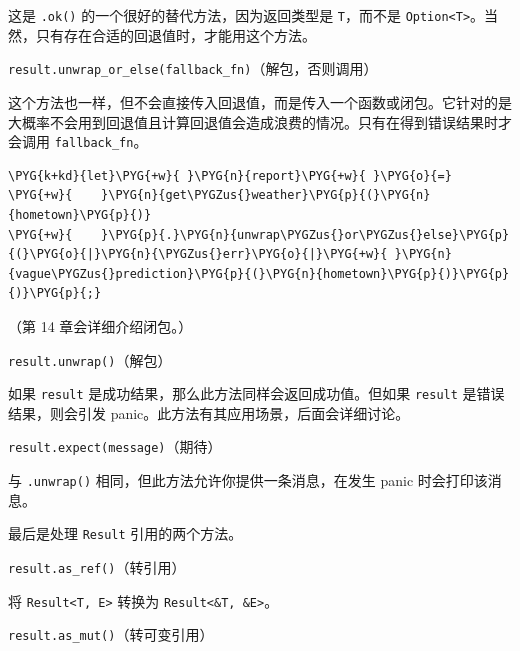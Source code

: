 这是 \texttt{.ok()} 的一个很好的替代方法，因为返回类型是 \texttt{T}，而不是 \texttt{Option<T>}。当然，只有存在合适的回退值时，才能用这个方法。

\begin{myNote}
\texttt{result.unwrap\_or\_else(fallback\_fn)}（解包，否则调用）
\end{myNote}

这个方法也一样，但不会直接传入回退值，而是传入一个函数或闭包。它针对的是大概率不会用到回退值且计算回退值会造成浪费的情况。只有在得到错误结果时才会调用 \texttt{fallback\_fn}。

\begin{Verbatim}[commandchars=\\\{\},breaklines=true,breakanywhere=true,fontsize=\codefont,xleftmargin=17bp]
\PYG{k+kd}{let}\PYG{+w}{ }\PYG{n}{report}\PYG{+w}{ }\PYG{o}{=}
\PYG{+w}{    }\PYG{n}{get\PYGZus{}weather}\PYG{p}{(}\PYG{n}{hometown}\PYG{p}{)}
\PYG{+w}{    }\PYG{p}{.}\PYG{n}{unwrap\PYGZus{}or\PYGZus{}else}\PYG{p}{(}\PYG{o}{|}\PYG{n}{\PYGZus{}err}\PYG{o}{|}\PYG{+w}{ }\PYG{n}{vague\PYGZus{}prediction}\PYG{p}{(}\PYG{n}{hometown}\PYG{p}{)}\PYG{p}{)}\PYG{p}{;}
\end{Verbatim}

（第 14 章会详细介绍闭包。）

\begin{mySidenote}
\texttt{result.unwrap()}（解包）
\end{mySidenote}

如果 \texttt{result} 是成功结果，那么此方法同样会返回成功值。但如果 \texttt{result} 是错误结果，则会引发 panic。此方法有其应用场景，后面会详细讨论。

\begin{mySidenote}
\texttt{result.expect(message)}（期待）
\end{mySidenote}

与 \texttt{.unwrap()} 相同，但此方法允许你提供一条消息，在发生 panic 时会打印该消息。

最后是处理 \texttt{Result} 引用的两个方法。

\begin{mySidenote}
\texttt{result.as\_ref()}（转引用）
\end{mySidenote}

将 \texttt{Result<T, E>} 转换为 \texttt{Result<\&T, \&E>}。

\begin{mySidenote}
\texttt{result.as\_mut()}（转可变引用）
\end{mySidenote}


